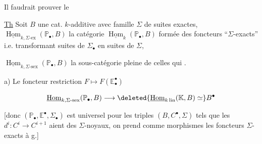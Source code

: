 
Il faudrait prouver le

\margin{!}

\uline{Th} Soit $B$ une cat.  $k$-additive avec famille $\Sigma$ de suites exactes,  $\underline{\operatorname{Hom}}_{k,\Sigma\text{-}\mathrm{ex}}(\mathbb P_{\bullet},B)$ la catégorie  $\underline{\operatorname{Hom}}_k(\mathbb P_{\bullet},B)$ formée des foncteurs ``$\Sigma$-exacts'' i.e. transformant suites de $\Sigma_{\bullet}$ en suites de $\Sigma$,


  $\underline{\operatorname{Hom}}_{k,\Sigma\text{-}\mathrm{sex}}(\mathbb P_{\bullet},B)$ la sous-catégorie pleine de celles qui . 

a) Le foncteur restriction $F\longmapsto F(\mathbb E^{\bullet}_{\bullet})$

\[
 \underline{\operatorname{Hom}}_{k,\Sigma\text{-}\mathrm{sex}}(\mathbb P_{\bullet},B)\longrightarrow\deleted{\underline{\operatorname{Hom}}_{k\,\mathrm{lin}}(\mathbb K,B)\simeq}B^{\bullet}
\]

  


[donc  $(\mathbb P_{\bullet},\mathbb E^{\bullet},\Sigma_{\bullet})$ est universel pour les triples $(B,C^{\bullet},\Sigma)$ tels que les $d^i:C^i\longrightarrow C^{i+1}$ aient des $\Sigma$-noyaux,  on prend comme morphismes les foncteurs  $\Sigma$-exacts à g.]

